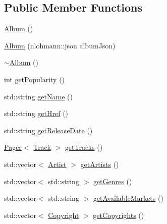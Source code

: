 \subsection*{Public Member Functions}
\begin{DoxyCompactItemize}
\item 
\mbox{\hyperlink{class_album_a5442b9cbed3b590e2e1151a9f262dd7a}{Album}} ()
\item 
\mbox{\hyperlink{class_album_a2288a063d899d20b1af2c10e04227f1e}{Album}} (nlohmann\+::json album\+Json)
\item 
\mbox{\hyperlink{class_album_a2c50054e79d185716987fe5edfcf62bf}{$\sim$\+Album}} ()
\item 
int \mbox{\hyperlink{class_album_abc27e8ac3854cd3404edc90ce7b92ef1}{get\+Popularity}} ()
\item 
std\+::string \mbox{\hyperlink{class_album_ab2b116edc307d99e6e3fe04b70b931da}{get\+Name}} ()
\item 
std\+::string \mbox{\hyperlink{class_album_ad52a5f5ca62fed1cd4e7f2636dc719cc}{get\+Href}} ()
\item 
std\+::string \mbox{\hyperlink{class_album_a04b6a6e333e7f78321fb7bffaf968dfa}{get\+Release\+Date}} ()
\item 
\mbox{\hyperlink{class_pager}{Pager}}$<$ \mbox{\hyperlink{class_track}{Track}} $>$ \mbox{\hyperlink{class_album_a9eb0152eac4b1519bfcf837241b32af1}{get\+Tracks}} ()
\item 
std\+::vector$<$ \mbox{\hyperlink{class_artist}{Artist}} $>$ \mbox{\hyperlink{class_album_a764b966638dd47de75a5533472455120}{get\+Artists}} ()
\item 
std\+::vector$<$ std\+::string $>$ \mbox{\hyperlink{class_album_a9bb76a0e2a0648972cb5fa76d143f7a1}{get\+Genres}} ()
\item 
std\+::vector$<$ std\+::string $>$ \mbox{\hyperlink{class_album_a64d390a4e116f149a0cc3d5e36846215}{get\+Available\+Markets}} ()
\item 
std\+::vector$<$ \mbox{\hyperlink{class_copyright}{Copyright}} $>$ \mbox{\hyperlink{class_album_abc64299bf27888be4724ffd1c30266a4}{get\+Copyrights}} ()
\end{DoxyCompactItemize}
